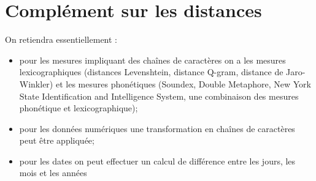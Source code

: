 \section{Compl\'ement sur les distances}
On retiendra essentiellement \cite{bensalem}:
\begin{itemize}[parsep=0cm,itemsep=0cm]
\item pour les mesures impliquant des chaînes de caractères on a les mesures lexicographiques (distances Levenshtein, distance Q-gram, distance de Jaro-Winkler) et les mesures phon\'etiques (Soundex, Double Metaphore, New York State Identification and Intelligence System, une combinaison des mesures phon\'etique et lexicographique);
\item pour les donn\'ees num\'eriques une transformation en chaînes de caractères peut \^etre appliqu\'ee;
\item pour les dates on peut effectuer un calcul de différence entre les jours, les mois et les années
\end{itemize} 


